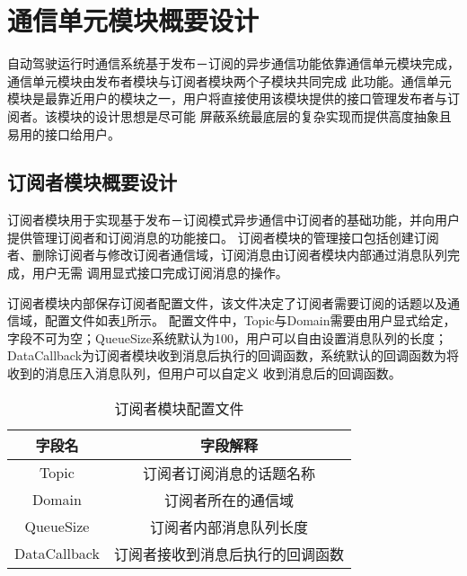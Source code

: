 \section{通信单元模块概要设计}
自动驾驶运行时通信系统基于发布－订阅的异步通信功能依靠通信单元模块完成，通信单元模块由发布者模块与订阅者模块两个子模块共同完成
此功能。通信单元模块是最靠近用户的模块之一，用户将直接使用该模块提供的接口管理发布者与订阅者。该模块的设计思想是尽可能
屏蔽系统最底层的复杂实现而提供高度抽象且易用的接口给用户。
\subsection{订阅者模块概要设计}
订阅者模块用于实现基于发布－订阅模式异步通信中订阅者的基础功能，并向用户提供管理订阅者和订阅消息的功能接口。
订阅者模块的管理接口包括创建订阅者、删除订阅者与修改订阅者通信域，订阅消息由订阅者模块内部通过消息队列完成，用户无需
调用显式接口完成订阅消息的操作。

订阅者模块内部保存订阅者配置文件，该文件决定了订阅者需要订阅的话题以及通信域，配置文件如表\ref{subscriber_config_file}所示。
配置文件中，Topic与Domain需要由用户显式给定，字段不可为空；QueueSize系统默认为100，用户可以自由设置消息队列的长度；
DataCallback为订阅者模块收到消息后执行的回调函数，系统默认的回调函数为将收到的消息压入消息队列，但用户可以自定义
收到消息后的回调函数。
\begin{table}[htb]
  \centering\small
  \caption{订阅者模块配置文件}
  \renewcommand\arraystretch{1.2}
  \label{subscriber_config_file}
  \begin{tabular}{cc}
    \toprule
    字段名 & 字段解释 \\
    \midrule
    Topic & 订阅者订阅消息的话题名称\\
    Domain & 订阅者所在的通信域\\
    QueueSize & 订阅者内部消息队列长度\\
    DataCallback & 订阅者接收到消息后执行的回调函数\\
    \bottomrule
  \end{tabular}
\end{table}

